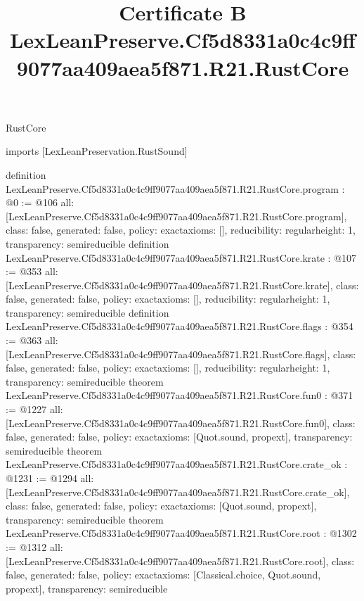 \begin{lexlean}{RustCore}
\title{Certificate B LexLeanPreserve.Cf5d8331a0c4c9ff9077aa409aea5f871.R21.RustCore}
\begin{coremodule}
imports [LexLeanPreservation.RustSound]

definition LexLeanPreserve.Cf5d8331a0c4c9ff9077aa409aea5f871.R21.RustCore.program : @0 := @106 {
  all: [LexLeanPreserve.Cf5d8331a0c4c9ff9077aa409aea5f871.R21.RustCore.program],
  class: false,
  generated: false,
  policy: exact{axioms: []},
  reducibility: regular{height: 1},
  transparency: semireducible
}
definition LexLeanPreserve.Cf5d8331a0c4c9ff9077aa409aea5f871.R21.RustCore.krate : @107 := @353 {
  all: [LexLeanPreserve.Cf5d8331a0c4c9ff9077aa409aea5f871.R21.RustCore.krate],
  class: false,
  generated: false,
  policy: exact{axioms: []},
  reducibility: regular{height: 1},
  transparency: semireducible
}
definition LexLeanPreserve.Cf5d8331a0c4c9ff9077aa409aea5f871.R21.RustCore.flags : @354 := @363 {
  all: [LexLeanPreserve.Cf5d8331a0c4c9ff9077aa409aea5f871.R21.RustCore.flags],
  class: false,
  generated: false,
  policy: exact{axioms: []},
  reducibility: regular{height: 1},
  transparency: semireducible
}
theorem LexLeanPreserve.Cf5d8331a0c4c9ff9077aa409aea5f871.R21.RustCore.fun0 : @371 := @1227 {
  all: [LexLeanPreserve.Cf5d8331a0c4c9ff9077aa409aea5f871.R21.RustCore.fun0],
  class: false,
  generated: false,
  policy: exact{axioms: [Quot.sound, propext]},
  transparency: semireducible
}
theorem LexLeanPreserve.Cf5d8331a0c4c9ff9077aa409aea5f871.R21.RustCore.crate_ok : @1231 := @1294 {
  all: [LexLeanPreserve.Cf5d8331a0c4c9ff9077aa409aea5f871.R21.RustCore.crate_ok],
  class: false,
  generated: false,
  policy: exact{axioms: [Quot.sound, propext]},
  transparency: semireducible
}
theorem LexLeanPreserve.Cf5d8331a0c4c9ff9077aa409aea5f871.R21.RustCore.root : @1302 := @1312 {
  all: [LexLeanPreserve.Cf5d8331a0c4c9ff9077aa409aea5f871.R21.RustCore.root],
  class: false,
  generated: false,
  policy: exact{axioms: [Classical.choice, Quot.sound, propext]},
  transparency: semireducible
}


\end{coremodule}
\end{lexlean}
